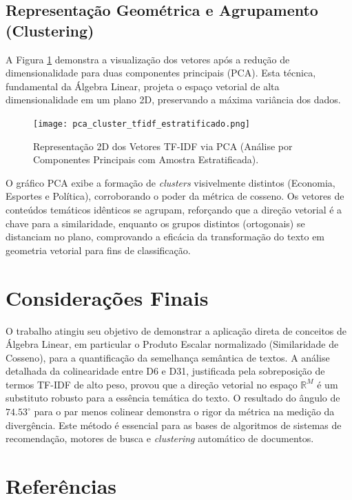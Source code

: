 \documentclass[a4paper, 12pt]{article}
\begin{document}
\subsection{Representação Geométrica e Agrupamento (Clustering)}

A Figura \ref{fig:pca_cluster} demonstra a visualização dos vetores após a redução de dimensionalidade para duas componentes principais (PCA). Esta técnica, fundamental da Álgebra Linear, projeta o espaço vetorial de alta dimensionalidade em um plano 2D, preservando a máxima variância dos dados.

\begin{figure}[H]
\centering
\texttt{[image: pca\_cluster\_tfidf\_estratificado.png]} 
\caption{Representação 2D dos Vetores TF-IDF via PCA (Análise por Componentes Principais com Amostra Estratificada).}
\label{fig:pca_cluster}
\end{figure}

O gráfico PCA exibe a formação de \textit{clusters} visivelmente distintos (Economia, Esportes e Política), corroborando o poder da métrica de cosseno. Os vetores de conteúdos temáticos idênticos se agrupam, reforçando que a direção vetorial é a chave para a similaridade, enquanto os grupos distintos (ortogonais) se distanciam no plano, comprovando a eficácia da transformação do texto em geometria vetorial para fins de classificação.

\section{Considerações Finais}

O trabalho atingiu seu objetivo de demonstrar a aplicação direta de conceitos de Álgebra Linear, em particular o Produto Escalar normalizado (Similaridade de Cosseno), para a quantificação da semelhança semântica de textos. A análise detalhada da colinearidade entre D6 e D31, justificada pela sobreposição de termos TF-IDF de alto peso, provou que a direção vetorial no espaço $\mathbb{R}^M$ é um substituto robusto para a essência temática do texto. O resultado do ângulo de $74.53^\circ$ para o par menos colinear demonstra o rigor da métrica na medição da divergência. Este método é essencial para as bases de algoritmos de sistemas de recomendação, motores de busca e \textit{clustering} automático de documentos.

\section{Referências}
\end{document}
